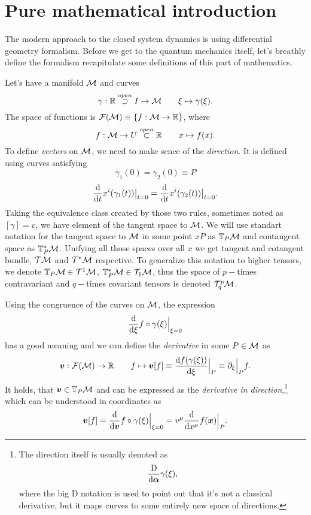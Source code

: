 \chapter{Pure mathematical introduction}
The modern approach to the closed system dynamics is using differential geometry formalism. Before we get to the quantum mechanics itself, let's breathly define the formalism recapitulate some definitions of this part of mathematics.

Let's have a manifold $\mathcal{M}$ and curves 
$$\gamma:\mathbb{R} \overset{open}{\supset} I \rightarrow \mathcal{M} \qquad \xi\mapsto \gamma(\xi).$$ 
The space of functions is $\mathcal{F}(\mathcal{M})\equiv\{f:\mathcal{M}\rightarrow \mathbb{R}\}$, where 
$$f:\mathcal{M}\rightarrow U\overset{open}{\subset} \mathbb{R} \qquad x\mapsto f(x).$$
To define \emph{vectors} on $\mathcal{M}$, we need to make sence of the \emph{direction}. It is defined using curves satisfying 
$$\gamma_1(0)=\gamma_2(0)\equiv P$$
$$\frac{\mathrm{d} }{\mathrm{d} t}x^i(\gamma_1(t))\big|_{t=0}=\frac{\mathrm{d} }{\mathrm{d} t}x^i(\gamma_2(t))\big|_{t=0}.$$
Taking the equivalence class created by those two rules, sometimes noted as $[\gamma]=v$, we have element of the tangent space to $\mathcal{M}$. We will use standart notation for the tangent space to $\mathcal{M}$ in some point $xP$ as $\mathbb{T}_P\mathcal{M}$ and contangent space as $\mathbb{T}^*_P\mathcal{M}$. Unifying all those spaces over all $x$ we get tangent and cotangent bundle, $\mathcal{T}\mathcal{M}$ and $\mathcal{T}^*\mathcal{M}$ respective. To generalize this notation to higher tensors, we denote $\mathbb{T}_P\mathcal{M}\in \mathcal{T}^1\mathcal{M}$, $\mathbb{T}^*_P\mathcal{M}\in \mathcal{T}_1\mathcal{M}$, thus the space of $p-$times contravariant and $q-$times covariant tensors is denoted $\mathcal{T}^p_q\mathcal{M}$.

Using the congruence of the curves on $\mathcal{M}$, the expression 
\begin{equation}
    \frac{\mathrm{d} }{\mathrm{d} \xi}f\circ \gamma(\xi)\Big|_{\xi=0}
\end{equation}
has a good meaning and we can define the \emph{derivative} in some $P\in\mathcal{M}$ as
\begin{equation}
    \bm v: \mathcal{F}(\mathcal{M})\rightarrow \mathbb{R} \qquad f\mapsto \bm v[f]\equiv \frac{\mathrm{d} f(\gamma(\xi))}{\mathrm{d} \xi}\Big|_P \equiv \partial_\xi\Big|_P f .
\end{equation}
It holds, that $\bm v\in \mathbb{T}_P\mathcal{M}$ and can be expressed as the \emph{derivative in direction},\footnote{
        The direction itself is usually denoted as
        \begin{equation}
            \frac{\mathrm{D}}{\mathrm{d}\bm\alpha}\gamma(\xi),
        \end{equation}
        where the big D notation is used to point out that it's not a classical derivative, but it maps curves to some entirely new space of directions.
    } 
which can be understood in coordinates as
\begin{equation}
    \bm v[f] = \frac{\mathrm{d} }{\mathrm{d} \bm v} f\circ \gamma(\xi)\Big|_{\xi=0}=v^\mu\frac{\mathrm{d} }{\mathrm{d} x^\mu} f(\bm x)\Big|_{P}.
\end{equation}




